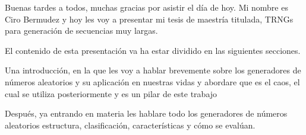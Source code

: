 \documentclass[12pt,a4paper]{article}
\author{Ciro Fabian Bermudez Marquez}
\begin{document}
Buenas tardes a todos, muchas gracias por asistir el día de hoy.
Mi nombre es Ciro Bermudez y hoy les voy a presentar mi tesis de 
maestría titulada, TRNGs para generación de secuencias muy largas.

El contenido de esta presentación va ha estar dividido en las 
siguientes secciones.

Una introducción, en la que les voy a hablar brevemente sobre los generadores de números aleatorios y su aplicación en nuestras vidas y abordare que es el caos, el cual 
se utiliza posteriormente y es un pilar de este trabajo

Después, ya entrando en materia les hablare todo los generadores de números aleatorios
estructura, clasificación, características y cómo se evalúan.




\nocite{*}


\end{document}
